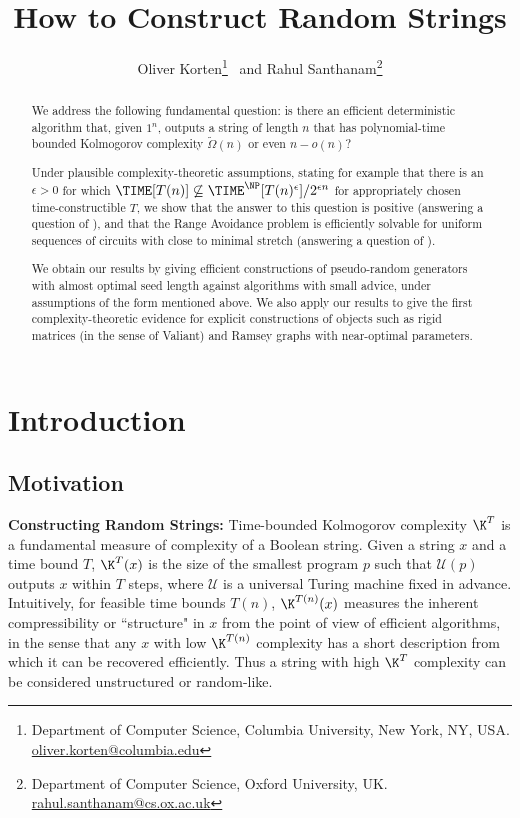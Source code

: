 \documentclass[11pt]{article}
\title{How to Construct Random Strings}
\author{Oliver Korten\thanks{Department of Computer Science, Columbia University, New York, NY, USA. \href{mailto:oliver.korten@columbia.edu}{oliver.korten@columbia.edu}} ~and Rahul Santhanam\thanks{Department of Computer Science, Oxford University, UK. \href{mailto:rahul.santhanam@cs.ox.ac.uk}{rahul.santhanam@cs.ox.ac.uk}}}
\begin{document}
\maketitle

\begin{abstract}
We address the following fundamental question: is there an efficient deterministic algorithm that, given $1^n$, outputs a string of length $n$ that has polynomial-time bounded Kolmogorov complexity $\tilde{\Omega}(n)$ or even $n - o(n)$?

Under plausible complexity-theoretic assumptions, stating for example that there is an $\epsilon > 0$ for which $\TIME[T(n)] \not \subseteq \TIME^{\NP}[T(n)^{\epsilon}]/2^{\epsilon n}$ for appropriately chosen time-constructible $T$, we show that the answer to this question is positive (answering a question of \cite{RSW22}), and that the Range Avoidance problem \cite{KKMP21, Korten21, RSW22} is efficiently solvable for uniform sequences of circuits with close to minimal stretch (answering a question of \cite{ILW23}). 

We obtain our results by giving efficient constructions of pseudo-random generators with almost optimal seed length against algorithms with small advice, under assumptions of the form mentioned above. We also apply our results to give the first complexity-theoretic evidence for explicit constructions of objects such as rigid matrices (in the sense of Valiant) and Ramsey graphs with near-optimal parameters.   
\end{abstract}

\newpage 

\section{Introduction}

\subsection{Motivation}

{\noindent \bf Constructing Random Strings:}  Time-bounded Kolmogorov complexity $\K^T$ \cite{LV19} is a fundamental measure of complexity of a Boolean string. Given a string $x$ and a time bound $T$, $\K^T(x)$ is the size of the smallest program $p$ such that $\mathcal{U}(p)$ outputs $x$ within $T$ steps, where $\mathcal{U}$ is a universal Turing machine fixed in advance. Intuitively, for feasible time bounds $T(n)$, $\K^{T(n)}(x)$ measures the inherent compressibility or ``structure" in $x$ from the point of view of efficient algorithms, in the sense that any $x$ with low $\K^{T(n)}$ complexity has a short description from which it can be recovered efficiently. Thus a string with high $\K^T$ complexity can be considered unstructured or random-like.
\end{document}

